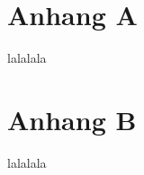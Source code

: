 \cleardoublepage
{}
{}		%
\renewcommand*{\thepage}{A\arabic{page}}
\appendix
{}

\chapter{Anhang A}
lalalala

\cleardoubleemptypage		%


\renewcommand*{\thepage}{B\arabic{page}}

\chapter{Anhang B}
lalalala

\cleardoubleemptypage		%